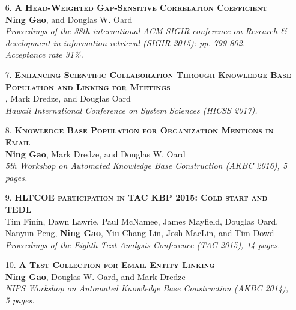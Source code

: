 \documentclass[a4paper, 11pt]{article}
\begin{document}
\begin{itemize}
\item[\color{bl3} 6.]{\scshape\color{bl3}\bf A Head-Weighted Gap-Sensitive Correlation Coefficient}\\
{\color{black} \textbf{Ning Gao}, and Douglas W. Oard} \\
\emph{Proceedings of the 38th international ACM SIGIR conference on Research \& development in information retrieval (SIGIR 2015): pp. 799-802.\\ Acceptance rate 31\%.}
\vspace{2mm}

\item[\color{bl3} 7.]{\scshape\color{bl3}\bf Enhancing Scientific Collaboration Through Knowledge Base Population and Linking for Meetings}\\
, Mark Dredze, and Douglas Oard\\
\emph{Hawaii International Conference on System Sciences (HICSS 2017).}
\vspace{2mm}

\item[\color{bl3} 8.]{\scshape\color{bl3}\bf Knowledge Base Population for Organization Mentions in Email}\\
{\color{black} \textbf{Ning Gao}, Mark Dredze, and Douglas W. Oard \\
\emph{5th Workshop on Automated Knowledge Base Construction (AKBC 2016), 5 pages.}}
\vspace{2mm}

\item[\color{bl3} 9.]{\scshape\color{bl3}\bf HLTCOE participation in TAC KBP 2015: Cold start and TEDL}\\
{\color{black}Tim Finin, Dawn Lawrie, Paul McNamee, James Mayfield, Douglas Oard, Nanyun Peng, \textbf{Ning Gao}, Yiu-Chang Lin, Josh MacLin, and Tim Dowd \\
\emph{Proceedings of the Eighth Text Analysis Conference (TAC 2015), 14 pages.}}
\vspace{2mm}




\item[\color{bl3} 10.]{\scshape\color{bl3}\bf A Test Collection for Email Entity Linking}\\
{\color{black} \textbf{Ning Gao}, Douglas W. Oard, and Mark Dredze \\
\emph{NIPS Workshop on Automated Knowledge Base Construction (AKBC 2014), 5 pages.}}
\vspace{2mm}


\end{itemize}
\end{document}
